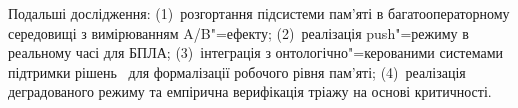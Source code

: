 \documentclass[11pt]{article}
\begin{document}
Подальші дослідження: (1)~розгортання підсистеми пам'яті в багатооператорному середовищі з вимірюванням A/B"=ефекту; (2)~реалізація push"=режиму в реальному часі для БПЛА; (3)~інтеграція з онтологічно"=керованими системами підтримки рішень~\citep{palagin2006architecture} для формалізації робочого рівня пам'яті; (4)~реалізація деградованого режиму та емпірична верифікація тріажу на основі критичності.




\end{document}
